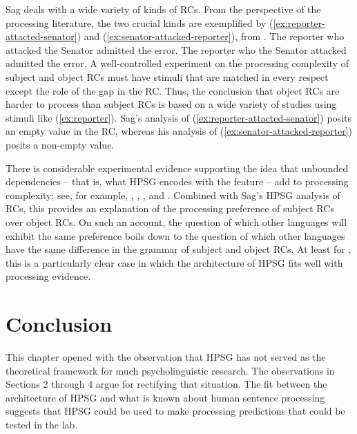 \documentclass[output=paper
	        ,collection
	        ,collectionchapter
 	        ,biblatex
                ,babelshorthands
                ,newtxmath
                ,draftmode
                ,colorlinks, citecolor=brown
]{langscibook}
\begin{document}
Sag deals with a wide variety of kinds of RCs. From the perspective of the processing literature, the two crucial kinds are exemplified by (\ref{ex:reporter-attacted-senator}) and (\ref{ex:senator-attacked-reporter}), from \citet{Gibson98a}.
\eal\label{ex:reporter}
\ex The reporter who attacked the Senator admitted the error.\label{ex:reporter-attacted-senator}
\ex The reporter who the Senator attacked admitted the error.\label{ex:senator-attacked-reporter}
\zl
A well-controlled experiment on the processing complexity of subject and object RCs must have stimuli that are matched in every respect except the role of the gap in the RC.  Thus, the conclusion that object RCs are harder to process than subject RCs is based on a wide variety of studies using stimuli like (\ref{ex:reporter}).  Sag's analysis of (\ref{ex:reporter-attacted-senator}) posits an empty \slasch{} value in the RC, whereas his analysis of (\ref{ex:senator-attacked-reporter}) posits a non-empty \slasch value.  

There is considerable experimental evidence supporting the idea that unbound\-ed dependencies -- that is, what HPSG encodes with the \isi{\slasch} feature -- add to processing complexity; see, for example, \citet{WannerMaratsos78}, \citet{KingJust91}, \citet{KluenderKutas93}, and \citet{Hawkins99a}.  Combined with Sag's HPSG analysis of  RCs, this provides an explanation of the processing preference of subject RCs over object RCs.  On such an account, the question of which other languages will exhibit the same preference boils down to the question of which other languages have the same difference in the grammar of subject and object RCs.  At least for , this is a particularly clear case in which the architecture of HPSG fits well with processing evidence.

\section{Conclusion}

This chapter opened with the observation that HPSG has not served as the theoretical framework for much psycholinguistic research.  The observations in Sections 2 through 4 argue for rectifying that situation.  The fit between the architecture of HPSG and what is known about human sentence processing suggests that HPSG could be used to make processing predictions that could be tested in the lab.  
\end{document}
